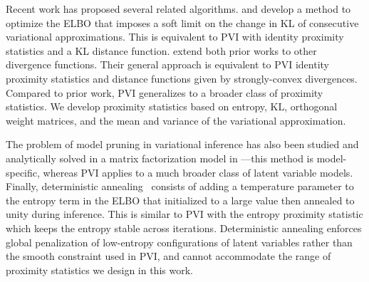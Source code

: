   Recent work has proposed several related algorithms. \citet{khan2015kullback} and \citet{Theis2015} develop a method to optimize the \gls{ELBO} that imposes a soft limit on the change in \gls{KL} of consecutive variational approximations. This is equivalent to \gls{PVI} with identity proximity statistics and a \gls{KL} distance function. \citet{Khan:2016:FSV:3020948.3020982} extend both prior works to other divergence functions. Their general approach is equivalent to \gls{PVI} identity proximity statistics and distance functions given by strongly-convex divergences. Compared to prior work, \gls{PVI} generalizes to a broader class of proximity statistics. We develop proximity statistics based on entropy, \gls{KL}, orthogonal weight matrices, and the mean and variance of the variational approximation.

The problem of model pruning in variational inference has also been studied and
analytically solved in a matrix factorization model in \citet{nakajima2013}---this method is model-specific, whereas \gls{PVI} applies to a much broader class of latent variable models. Finally, deterministic annealing~\citep{Katihara:2008} consists of adding a temperature parameter to the entropy term in the \gls{ELBO} that initialized to a large value then annealed to unity during inference. This is similar to \gls{PVI} with the entropy proximity statistic which keeps the entropy stable across iterations. Deterministic annealing enforces global penalization of low-entropy configurations of latent variables rather than the smooth constraint used in \gls{PVI}, and cannot accommodate the range of proximity statistics we design in this work.